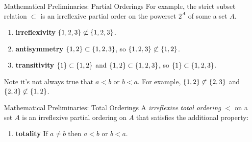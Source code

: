 \begin{frame}{Mathematical Preliminaries: Partial Orderings}
  For example, the strict subset relation $\subset$ is an irreflexive partial
  order on the powerset $2^A$ of some a set $A$.
  \begin{enumerate}
    \item \textbf{irreflexivity} $\left\{1, 2, 3\right\} \not\subset \left\{1, 2, 3\right\}$.
    \item \textbf{antisymmetry} $\left\{1, 2\right\} \subset \left\{1, 2, 3\right\}$, so $\left\{1,
      2, 3\right\} \not\subset \left\{1, 2\right\}$.
    \item \textbf{transitivity} $\left\{1\right\} \subset \left\{1, 2\right\}$ and $\left\{1, 2\right\}
      \subset \left\{1, 2, 3\right\}$, so $\left\{1\right\} \subset \left\{1, 2, 3\right\}$.
  \end{enumerate}

  \pause

  Note it's not always true that $a < b$ or $b < a$. For example, $\left\{1, 2\right\}
  \not\subset \left\{2, 3\right\}$ and $\left\{2, 3\right\} \not\subset \left\{1, 2\right\}$.
\end{frame}

\begin{frame}{Mathematical Preliminaries: Total Orderings}
  A \emph{irreflexive total ordering} $<$ on a set $A$ is an irreflexive
  partial ordering on $A$ that satisfies the additional property:
  \begin{enumerate}
    \item \textbf{totality} If $a \neq b$ then $a < b$ or $b < a$.
  \end{enumerate}
\end{frame}

\whattime{}

%
%
%
\spacetime{}

